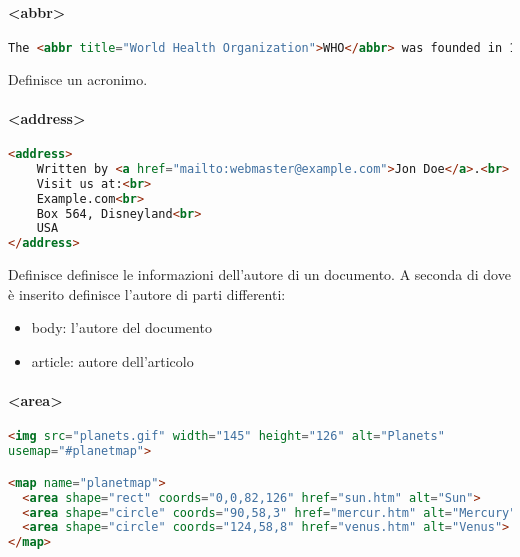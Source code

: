 \documentclass[11pt,a4paper]{book}
\begin{document}
\paragraph{<abbr>}
\begin{lstlisting}[language = HTML]
The <abbr title="World Health Organization">WHO</abbr> was founded in 1948.
\end{lstlisting}
Definisce un acronimo.

\paragraph{<address>}
\begin{lstlisting}[language = HTML]
<address>
	Written by <a href="mailto:webmaster@example.com">Jon Doe</a>.<br>
	Visit us at:<br>
	Example.com<br>
	Box 564, Disneyland<br>
	USA
</address>
\end{lstlisting}
Definisce definisce le informazioni dell'autore di un documento. A seconda di dove è inserito definisce l'autore di parti differenti:
\begin{itemize}
	\item body: l'autore del documento
	\item article: autore dell'articolo
\end{itemize}


\paragraph{<area>}
\begin{lstlisting}[language = HTML]
<img src="planets.gif" width="145" height="126" alt="Planets"
usemap="#planetmap">

<map name="planetmap">
  <area shape="rect" coords="0,0,82,126" href="sun.htm" alt="Sun">
  <area shape="circle" coords="90,58,3" href="mercur.htm" alt="Mercury">
  <area shape="circle" coords="124,58,8" href="venus.htm" alt="Venus">
</map>
\end{lstlisting}
\end{document}

